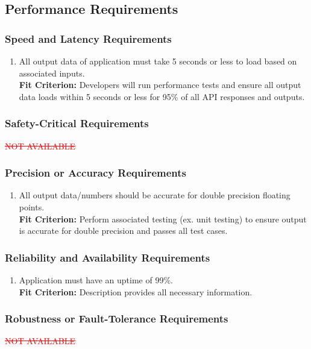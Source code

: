 \documentclass[12pt,letterpaper]{article}
\begin{document}
\subsection{Performance Requirements}
\subsubsection{Speed and Latency Requirements}
\begin{enumerate}[{PE}1.] 
	\item All output data of application must take 5 seconds or less to load based on associated inputs.\\
	{\textbf{Fit Criterion:} Developers will run performance tests and ensure all output data loads within 5 seconds or less for 95\% of all API responses and outputs.}
\end{enumerate}

\subsubsection{Safety-Critical Requirements}
\textcolor{red}{\sout{NOT AVAILABLE}}

\subsubsection{Precision or Accuracy Requirements}
\begin{enumerate}[resume*] 
	\item All output data/numbers should be accurate for double precision floating points.\\
	{\textbf{Fit Criterion:} Perform associated testing (ex. unit testing) to ensure output is accurate for double precision and passes all test cases. }
\end{enumerate}

\subsubsection{Reliability and Availability Requirements}
\begin{enumerate}[resume*] 
	\item Application must have an uptime of 99\%.\\
	{\textbf{Fit Criterion:} Description provides all necessary information. }
\end{enumerate}

\subsubsection{Robustness or Fault-Tolerance Requirements}
\textcolor{red}{\sout{NOT AVAILABLE}}
\end{document}
